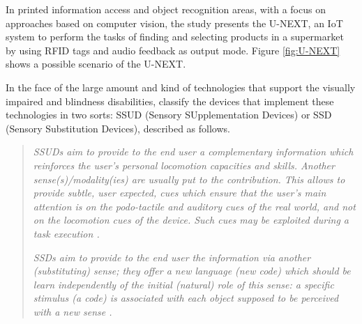 In printed information access and object recognition areas, with a focus on approaches based on computer vision, the study  presents the U-NEXT, an IoT system to perform the tasks of finding and selecting products in a supermarket by using RFID tags and audio feedback as output mode. Figure \ref{fig:U-NEXT} shows a possible scenario of the U-NEXT.

 	\begin{figure}[h] 
   	    \captionsetup{width=9cm}%
	\end{figure}

In the face of the large amount and kind of technologies that support the visually impaired and blindness disabilities,  classify the devices that implement these technologies in two sorts: \gls{SSUD} (Sensory SUpplementation Devices) or \gls{SSD} (Sensory Substitution Devices), described as follows.
\begin{quotation}
\textit{\glspl{SSUD} aim to provide to the end user a complementary information which reinforces the user’s personal locomotion capacities and skills. Another sense(s)/modality(ies) are usually put to the contribution. This allows to provide subtle, user expected, cues which ensure that the user’s main attention is on the podo-tactile and auditory cues of the real world, and not on the locomotion cues of the device. Such cues may be exploited during a task execution \cite{Pissaloux2018a}.}

\textit{\glspl{SSD} aim to provide to the end user the information via another (substituting) sense; they offer a new language (new code) which should be learn independently of the initial (natural) role of this sense: a specific stimulus (a code) is associated with each object supposed to be perceived with a new sense \cite{Pissaloux2018a}.}
\end{quotation}

